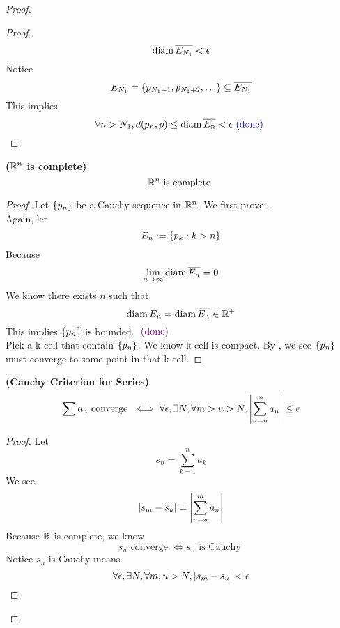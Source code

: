 \documentclass{report}
\begin{document}
\begin{proof}
\begin{proof}
\begin{equation}
\text{diam}\, \overline{E_{N_1}}<\epsilon 
\end{equation}
Notice
\begin{equation}
E_{N_1}=\set{p_{N_1+1},p_{N_1+2},\dots }\subseteq \overline{E_{N_1}}
\end{equation}
This implies 
\begin{equation}
\forall n>N_1, d(p_n,p)\leq \text{diam}\, \overline{E_n}<\epsilon \textcolor{blue}{\text{ (done) }}
\end{equation}
\end{proof}
\begin{corollary}
\label{1.13.9}
\textbf{($\mathbb{R}^n$ is complete)}
\begin{equation}
\mathbb{R}^n\text{ is complete }
\end{equation}
\end{corollary}
\begin{proof}
Let $\{ p_n \}$ be a Cauchy sequence in $\mathbb{R}^n$. We first prove .\\

Again, let
\begin{equation}
E_n:=\{ p_k:k>n \}
\end{equation}
Because 
\begin{equation}
\lim_{n\to\infty}\text{diam}\, \overline{E_n}=0
\end{equation}
We know there exists $n$ such that
 \begin{equation}
\text{diam}\, E_n=\text{diam}\, \overline{E_n}\in\mathbb{R}^+
\end{equation}
This implies $\{ p_n \}$ is bounded. $\textcolor{violet}{\text{ (done) }}$\\

Pick a k-cell that contain $\{ p_n \}$. We know k-cell is compact. By , we see $\{ p_n \}$ must converge to some point in that k-cell.
\end{proof}
\begin{corollary}
\label{1.13.10}
\textbf{(Cauchy Criterion for Series)}  
\begin{equation}
\sum a_n\text{ converge }\iff \forall \epsilon ,\exists N, \forall m>u>N, \left|\sum_{n=u}^m a_n\right|\leq \epsilon 
\end{equation}
\end{corollary}
\begin{proof}
Let 
 \begin{equation}
s_n=\sum_{k=1}^n a_k
\end{equation}
We see 
\begin{equation}
  \left|s_m-s_u\right|=\left|\sum_{n=u}^m a_n\right|
\end{equation}
Because $\mathbb{R}$ is complete, we know 
 \begin{equation}
s_n\text{ converge }\iff  s_n\text{ is Cauchy }
\end{equation}
Notice $s_n$ is Cauchy means 
 \begin{equation}
\forall \epsilon, \exists N, \forall m,u>N, \left|s_m-s_u\right|<\epsilon 
\end{equation}
\end{proof}

\end{proof}
\end{document}
